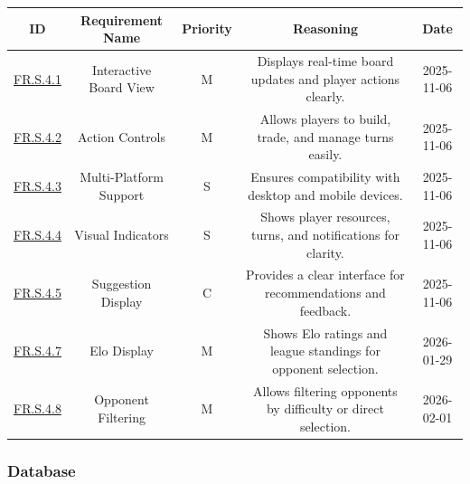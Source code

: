 \documentclass{article}
\begin{document}
\begin{tabular}{|c|c|c|c|c|}
\hline
\textbf{ID} & \textbf{Requirement Name} & \textbf{Priority} &
\textbf{Reasoning} & \textbf{Date} \\
\hline
\hyperref[FR.S.4.1]{FR.S.4.1} & Interactive Board View & M &
\parbox[t]{4cm}{Displays real-time board updates and player actions clearly.} &
2025-11-06 \\
\hline
\hyperref[FR.S.4.2]{FR.S.4.2} & Action Controls & M &
\parbox[t]{4cm}{Allows players to build, trade, and manage turns easily.} &
2025-11-06 \\
\hline
\hyperref[FR.S.4.3]{FR.S.4.3} & Multi-Platform Support & S &
\parbox[t]{4cm}{Ensures compatibility with desktop and mobile devices.} &
2025-11-06 \\
\hline
\hyperref[FR.S.4.4]{FR.S.4.4} & Visual Indicators & S &
\parbox[t]{4cm}{Shows player resources, turns, and notifications for clarity.} &
2025-11-06 \\
\hline
\hyperref[FR.S.4.5]{FR.S.4.5} & \AI{} Suggestion Display & C &
\parbox[t]{4cm}{Provides a clear interface for \AI{} recommendations and feedback.} &
2025-11-06 \\
\hline
\hyperref[FR.S.4.7]{FR.S.4.7} & Elo Display & M &
\parbox[t]{4cm}{Shows Elo ratings and league standings for opponent selection.} &
2026-01-29 \\
\hline
\hyperref[FR.S.4.8]{FR.S.4.8} & Opponent Filtering & M &
\parbox[t]{4cm}{Allows filtering opponents by difficulty or direct selection.} &
2026-02-01 \\
\hline
\end{tabular}

\vspace{1em}

\subsubsection*{\GameState{} Database}
\end{document}
